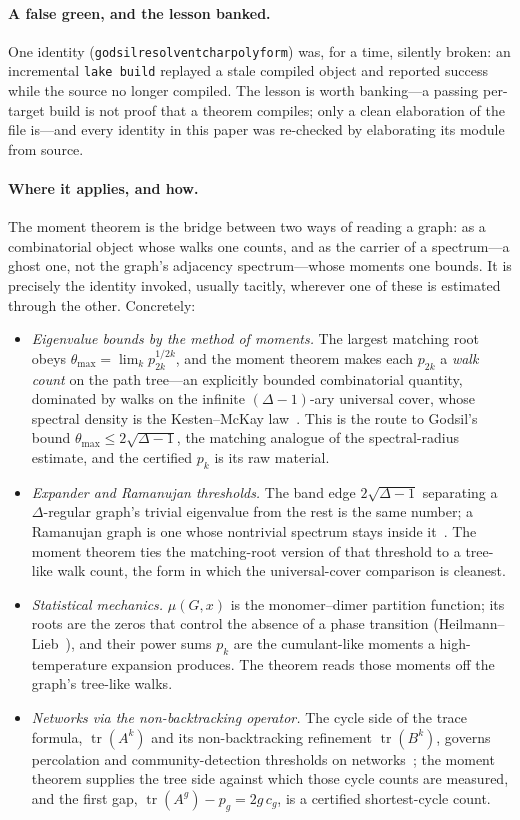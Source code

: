 \documentclass[11pt]{article}
\newcommand{\lean}[1]{{\def\_{\textunderscore\allowbreak}\texttt{#1}}}
\DeclareMathOperator{\tr}{tr}
\begin{document}
\paragraph{A false green, and the lesson banked.} One identity
(\lean{godsil\_resolvent\_charpoly\_form}) was, for a time, silently broken: an incremental
\lean{lake build} replayed a stale compiled object and reported success while the source no longer
compiled. The lesson is worth banking---a passing per-target build is not proof that a theorem
compiles; only a clean elaboration of the file is---and every identity in this paper was re-checked by
elaborating its module from source.

\paragraph{Where it applies, and how.} The moment theorem is the bridge between two ways of reading a
graph: as a combinatorial object whose walks one counts, and as the carrier of a spectrum---a ghost
one, not the graph's adjacency spectrum---whose moments one bounds. It is precisely the identity invoked, usually tacitly, wherever one of these is
estimated through the other. Concretely:
\begin{itemize}
\item \emph{Eigenvalue bounds by the method of moments.} The largest matching root obeys
$\theta_{\max}=\lim_k p_{2k}^{1/2k}$, and the moment theorem makes each $p_{2k}$ a \emph{walk count}
on the path tree---an explicitly bounded combinatorial quantity, dominated by walks on the infinite
$(\Delta-1)$-ary universal cover, whose spectral density is the Kesten--McKay
law~\cite{McKay,AngelFriedmanHoory}. This is the route to Godsil's bound
$\theta_{\max}\le2\sqrt{\Delta-1}$,
the matching analogue of the spectral-radius estimate, and the certified $p_k$ is its raw material.
\item \emph{Expander and Ramanujan thresholds.} The band edge $2\sqrt{\Delta-1}$ separating a
$\Delta$-regular graph's trivial eigenvalue from the rest is the same number; a Ramanujan graph is one
whose nontrivial spectrum stays inside it~\cite{MSS}. The moment theorem ties the matching-root
version of that threshold to a tree-like walk count, the form in which the universal-cover comparison
is cleanest.
\item \emph{Statistical mechanics.} $\mu(G,x)$ is the monomer--dimer partition function; its roots
are the zeros that control the absence of a phase transition (Heilmann--Lieb~\cite{HeilmannLieb}), and
their power sums $p_k$ are the cumulant-like moments a high-temperature expansion produces. The
theorem reads those moments off the graph's tree-like walks.
\item \emph{Networks via the non-backtracking operator.} The cycle side of the trace formula,
$\tr(A^k)$ and its non-backtracking refinement $\tr(B^k)$, governs percolation and community-detection
thresholds on networks~\cite{Hashimoto,IharaBass}; the moment theorem supplies the tree side against
which those cycle counts are measured, and the first gap, $\tr(A^g)-p_g=2g\,c_g$, is a certified
shortest-cycle count.
\end{itemize}
\end{document}
